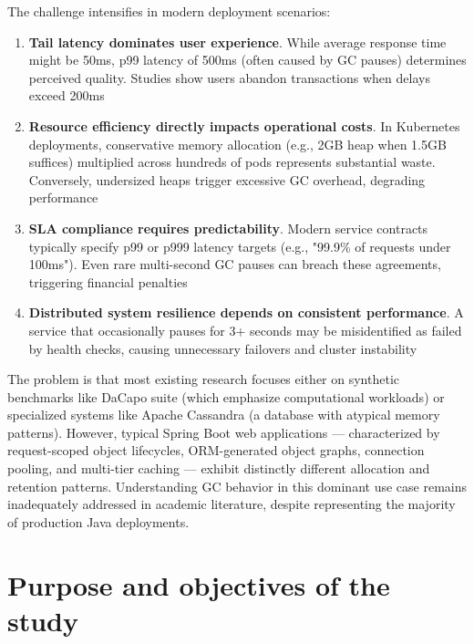 The challenge intensifies in modern deployment scenarios:

\begin{enumerate}
    \item \textbf{Tail latency dominates user experience}. While average response time might be 50ms, p99 latency of 500ms (often caused by GC pauses) determines perceived quality. Studies show users abandon transactions when delays exceed 200ms \cite{carpen2015performance}
    
    \item \textbf{Resource efficiency directly impacts operational costs}. In Kubernetes deployments, conservative memory allocation (e.g., 2GB heap when 1.5GB suffices) multiplied across hundreds of pods represents substantial waste. Conversely, undersized heaps trigger excessive GC overhead, degrading performance
    
    \item \textbf{SLA compliance requires predictability}. Modern service contracts typically specify p99 or p999 latency targets (e.g., "99.9\% of requests under 100ms"). Even rare multi-second GC pauses can breach these agreements, triggering financial penalties
    
    \item \textbf{Distributed system resilience depends on consistent performance}. A service that occasionally pauses for 3+ seconds may be misidentified as failed by health checks, causing unnecessary failovers and cluster instability
\end{enumerate}

The problem is that most existing research \cite{carpen2015performance, pufek2019analysis, grgic2018comparison} focuses either on synthetic benchmarks like DaCapo suite (which emphasize computational workloads) or specialized systems like Apache Cassandra (a database with atypical memory patterns). However, typical Spring Boot web applications --- characterized by request-scoped object lifecycles, ORM-generated object graphs, connection pooling, and multi-tier caching --- exhibit distinctly different allocation and retention patterns. Understanding GC behavior in this dominant use case remains inadequately addressed in academic literature, despite representing the majority of production Java deployments.

\section{Purpose and objectives of the study}
\label{sec:objectives}

